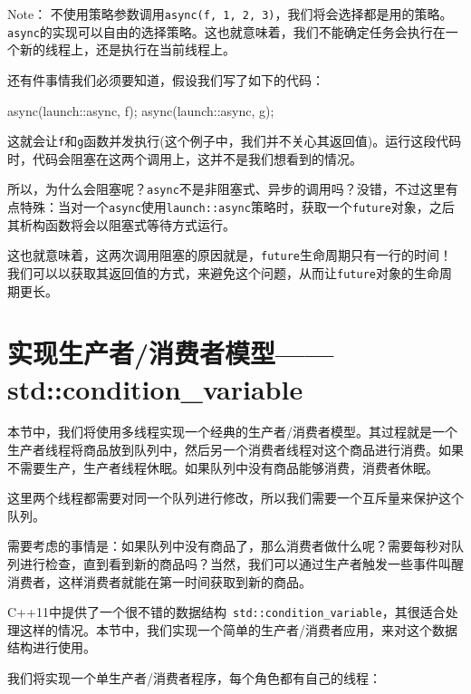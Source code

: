 \begin{myInfoBox}
Note： 不使用策略参数调用\texttt{async(f, 1, 2, 3)}，我们将会选择都是用的策略。\texttt{async}的实现可以自由的选择策略。这也就意味着，我们不能确定任务会执行在一个新的线程上，还是执行在当前线程上。
\end{myInfoBox}


还有件事情我们必须要知道，假设我们写了如下的代码：

\begin{codebox}[cpp]
async(launch::async, f);
async(launch::async, g);
\end{codebox}

这就会让\texttt{f}和\texttt{g}函数并发执行(这个例子中，我们并不关心其返回值)。运行这段代码时，代码会阻塞在这两个调用上，这并不是我们想看到的情况。

所以，为什么会阻塞呢？\texttt{async}不是非阻塞式、异步的调用吗？没错，不过这里有点特殊：当对一个\texttt{async}使用\texttt{launch::async}策略时，获取一个\texttt{future}对象，之后其析构函数将会以阻塞式等待方式运行。

这也就意味着，这两次调用阻塞的原因就是，\texttt{future}生命周期只有一行的时间！我们可以以获取其返回值的方式，来避免这个问题，从而让\texttt{future}对象的生命周期更长。


\section{实现生产者/消费者模型——std::condition\_variable}

本节中，我们将使用多线程实现一个经典的生产者/消费者模型。其过程就是一个生产者线程将商品放到队列中，然后另一个消费者线程对这个商品进行消费。如果不需要生产，生产者线程休眠。如果队列中没有商品能够消费，消费者休眠。

这里两个线程都需要对同一个队列进行修改，所以我们需要一个互斥量来保护这个队列。

需要考虑的事情是：如果队列中没有商品了，那么消费者做什么呢？需要每秒对队列进行检查，直到看到新的商品吗？当然，我们可以通过生产者触发一些事件叫醒消费者，这样消费者就能在第一时间获取到新的商品。

C++11中提供了一个很不错的数据结构\texttt{ std::condition\_variable}，其很适合处理这样的情况。本节中，我们实现一个简单的生产者/消费者应用，来对这个数据结构进行使用。


我们将实现一个单生产者/消费者程序，每个角色都有自己的线程：

